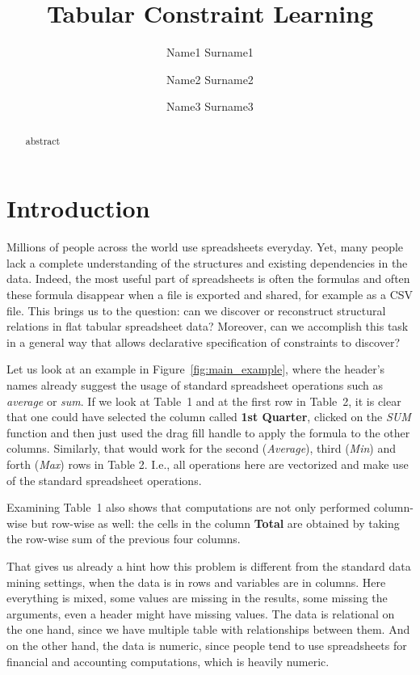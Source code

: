 \documentclass{ecai}
\begin{document}
\title{Tabular Constraint Learning}

\author{Name1 Surname1 \and Name2 Surname2 \and Name3 Surname3 \institute{----------------------} }

\maketitle

\begin{abstract}
  abstract
\end{abstract}

\section{Introduction}
Millions of people across the world use spreadsheets everyday.
Yet, many people lack a complete understanding of the structures and existing dependencies in the data.
Indeed, the most useful part of spreadsheets is often the formulas and often these formula disappear when a file is exported and shared, for example as a CSV file.
This brings us to the question: can we discover or reconstruct structural relations in flat tabular spreadsheet data?
Moreover, can we accomplish this task in a general way that allows declarative specification of constraints to discover?


Let us look at an example in Figure~\ref{fig:main_example}, where the header's names already suggest the usage of standard spreadsheet operations such as \textit{average} or \textit{sum}.
If we look at Table~1 and at the first row in Table~2, it is clear that one could have selected the column called \textbf{1st Quarter}, clicked on the \textit{SUM} function and then just used the drag fill handle to apply the formula to the other columns.
Similarly, that would work for the second (\textit{Average}), third (\textit{Min})  and forth (\textit{Max}) rows in Table 2.
I.e., all operations here are vectorized and make use of the standard spreadsheet operations.

Examining Table~1 also shows that computations are not only performed column-wise but row-wise as well: the cells in the column \textbf{Total} are obtained by taking the row-wise sum of the previous four columns.

That gives us already a hint how this problem is different from the standard data mining settings, when the data is in rows and variables are in columns. Here everything is mixed, some values are missing in the results, some missing the arguments, even a header might have missing values. The data is relational on the one hand, since we have multiple table with relationships between them. And on the other hand, the data is numeric, since people tend to use spreadsheets for financial and accounting computations, which is heavily numeric.
\end{document}
